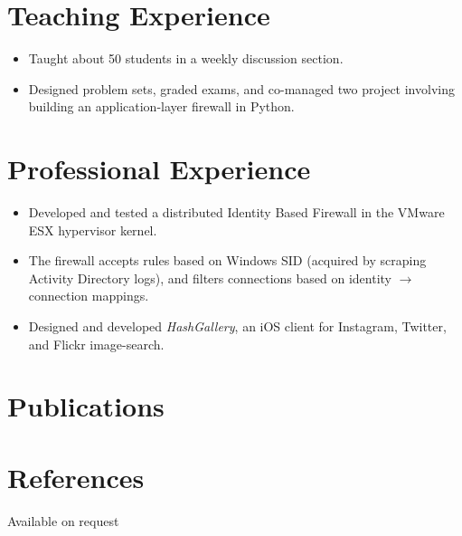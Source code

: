 \documentclass[11pt,letterpaper,sans]{moderncv}
\begin{document}
\section{Teaching Experience}
 {
\begin{itemize}
\item Taught about 50 students in a weekly discussion section.
\item Designed problem sets, graded exams, and co-managed two project involving
building an application-layer firewall in Python.
\end{itemize}
}

\section{Professional Experience}

 {
\begin{itemize}
\item Developed and tested a distributed Identity Based Firewall in the VMware
ESX hypervisor kernel.
\item The firewall accepts rules based on Windows SID (acquired by scraping
Activity Directory logs), and filters connections based on identity
$\rightarrow$ connection mappings.
\end{itemize}
}


 {
\begin{itemize} 
\item Designed and developed \emph{HashGallery}, an iOS client for Instagram,
Twitter, and Flickr image-search.
\end{itemize}
}

\section{Publications}


\section{References}
Available on request
\end{document}
